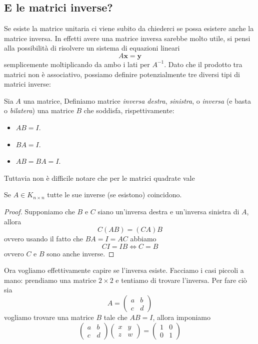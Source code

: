 \documentclass[11pt]{scrartcl}
\begin{document}
 	\subsection{E le matrici inverse?}
 	Se esiste la matrice unitaria ci viene subito da chiederci se possa esistere anche la matrice inversa. In effetti avere una matrice inversa sarebbe molto utile, si pensi alla possibilità di risolvere un sistema di equazioni lineari
 	$$A\mathbf{x}=\mathbf{y}$$
 	semplicemente moltiplicando da ambo i lati per $A^{-1}$. Dato che il prodotto tra matrici non è associativo, possiamo definire potenzialmente tre diversi tipi di matrici inverse:
 	\begin{definition}
 		Sia $A$ una matrice, Definiamo matrice \textit{inversa destra}, \textit{sinistra}, o \textit{inversa} (e basta o \textit{bilatera}) una matrice $B$ che soddisfa, rispettivamente:
 		\begin{itemize}
 			\item $AB=I$.
 			\item $BA=I$.
 			\item $AB=BA=I$.
 		\end{itemize}
 	\end{definition}
 	Tuttavia non è difficile notare che per le matrici quadrate vale
 	\begin{lemma}
 		Se $A\in K_{n\times n}$ tutte le sue inverse (se esistono) coincidono.
 	\end{lemma}
 	\begin{proof}
 		Supponiamo che $B$ e $C$ siano un'inversa destra e un'inversa sinistra di $A$, allora
 		$$C(AB)=(CA)B$$
 		ovvero usando il fatto che $BA=I=AC$ abbiamo
 		$$CI=IB \iff C=B$$
 		ovvero $C$ e $B$ sono anche inverse.
 	\end{proof}
 	Ora vogliamo effettivamente capire se l'inversa esiste. Facciamo i casi piccoli a mano: prendiamo una matrice $2\times 2$ e tentiamo di trovare l'inversa. Per fare ciò sia 
 	$$A=
 	\begin{pmatrix}
 		a & b \\
 		c & d
 	\end{pmatrix}
 	$$
 	vogliamo trovare una matrice $B$ tale che $AB=I$, allora imponiamo
 	$$
 	\begin{pmatrix}
 		a & b \\
 		c & d
 	\end{pmatrix}
 	\begin{pmatrix}
 		x & y \\
 		z & w
 	\end{pmatrix}
 	= 
 	\begin{pmatrix}
 		1 & 0 \\
 		0 & 1
 	\end{pmatrix}
 	$$
\end{document}
